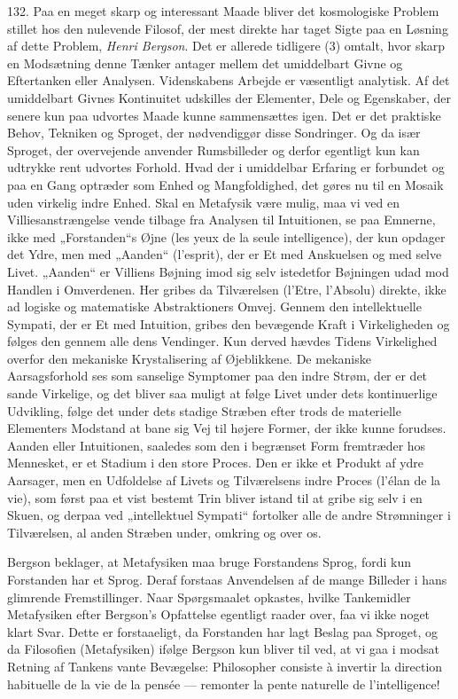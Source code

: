 \documentclass[12pt,a4paper]{book}
\newcommand{\opage}[1]{\marginnote{\footnotesize\textit{[#1]}}}
\newcommand{\apage}[1]{\marginnote{\footnotesize\textit{[#1]}}}
\begin{document}
132. Paa en meget skarp og interessant Maade bliver det kosmologiske Problem stillet hos
den nulevende Filosof, der mest direkte har taget Sigte paa en Løsning af dette Problem,
\emph{Henri Bergson}. Det er allerede tidligere (3) omtalt, hvor skarp en Modsætning
denne Tænker antager mellem det umiddelbart Givne og Eftertanken eller Analysen.
Videnskabens Arbejde er væsentligt analytisk. Af det umiddelbart Givnes Kontinuitet
udskilles der Elementer, Dele og Egenskaber, der senere kun paa udvortes Maade kunne
sammensættes igen. Det er det praktiske Behov, Tekniken og Sproget, der nødvendiggør
disse Sondringer. Og da især Sproget, der overvejende anvender Rumsbilleder og derfor
egentligt kun kan udtrykke rent udvortes Forhold. Hvad der i umiddelbar Erfaring er
forbundet og paa en Gang optræder som Enhed og Mangfoldighed, det gøres nu til en Mosaik
uden \apage{316} virkelig indre Enhed. Skal en Metafysik være mulig, maa vi ved en
Villiesanstrængelse vende tilbage fra Analysen til Intuitionen, se paa Emnerne, ikke med
„Forstanden“s Øjne (les yeux de la seule intelligence), der kun opdager det Ydre, men
med „Aanden“ (l'esprit), der er Et med Anskuelsen og med selve Livet. „Aanden“ er
Villiens Bøjning imod sig selv istedetfor Bøjningen udad mod Handlen i Omverdenen. Her
gribes da Tilværelsen (l'Etre, l'Absolu) direkte, ikke ad logiske og matematiske
Abstraktioners Omvej. Gennem den intellektuelle Sympati, der er Et med Intuition, gribes
den bevægende Kraft i Virkeligheden og følges den gennem alle dens Vendinger. Kun derved
hævdes Tidens Virkelighed overfor den mekaniske Krystalisering af Øjeblikkene. De
mekaniske Aarsagsforhold ses som sanselige Symptomer paa den indre Strøm, der er det
sande Virkelige, og det bliver saa muligt at følge Livet under dets kontinuerlige
Udvikling, følge det under dets stadige Stræben efter trods de materielle Elementers
Modstand at bane sig Vej til højere Former, der ikke kunne forudses. Aanden eller
Intuitionen, saaledes som den i begrænset Form fremtræder hos Mennesket, er et Stadium i
den store Proces. Den er ikke et Produkt af ydre Aarsager, men en Udfoldelse af Livets
og Tilværelsens indre Proces (l'élan de la vie), som først paa et vist bestemt Trin
bliver istand til at gribe sig selv i en Skuen, og derpaa ved „intellektuel Sympati“
fortolker alle de andre Strømninger i Tilværelsen, al anden Stræben under, omkring og
over os.

Bergson beklager, at Metafysiken maa bruge Forstandens Sprog, fordi kun Forstanden har
et Sprog. Deraf forstaas Anvendelsen af de mange Billeder i hans glimrende
Fremstillinger. Naar Spørgsmaalet opkastes, hvilke Tankemidler Metafysiken efter
Bergson's Opfattelse egentligt raader over, faa vi ikke noget klart Svar. Dette er
forstaaeligt, da Forstanden har lagt Beslag paa Sproget, og da Filosofien (Metafysiken)
ifølge Bergson kun bliver til ved, at vi gaa i modsat Retning af Tankens vante
Bevægelse: Philosopher \opage{317} consiste à invertir la direction habituelle de la vie de la
pensée --- remonter la pente naturelle de l'intelligence!
\end{document}
